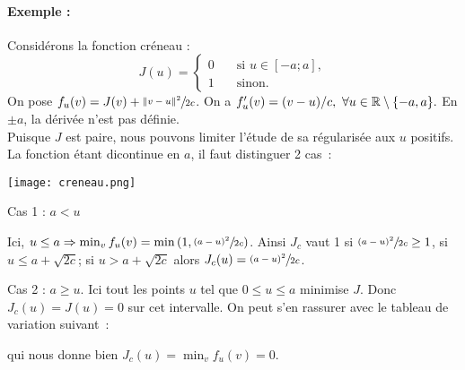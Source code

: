 \documentclass[main.tex]{subfiles}
\begin{document}
\begin{multicols}{2}
\paragraph{Exemple :} Considérons la fonction créneau :
$$J(u)= \left\{  \begin{aligned}
0 \quad & \textrm{si } u \in [-a;a], \\ 1 \quad & \textrm{sinon}. 
\end{aligned}   \right. $$
On pose $f_u(v) = J(v) + \sfrac{\| v-u \|^2}{2c}$.
On a $f'_u(v) = (v-u)/c, \ \forall u \in \mathbb{R} \setminus \{ -a, a \}. $
En $\pm a$, la dérivée n'est pas définie. \\
Puisque $J$ est paire, nous pouvons limiter l'étude de sa régularisée aux $u$ positifs. La fonction étant dicontinue en $a$, il faut distinguer 2 cas~:
\begin{center}
\texttt{[image: creneau.png]}
\end{center}
\end{multicols}
\begin{myitemize}
\renewcommand{\labelitemi}{\scriptsize$\bullet$} 
\item Cas 1 : $a < u$
\begin{center}
\end{center}
Ici, $u\leq a \Rightarrow \min_v f_u(v) = \min \left(1, \sfrac{(a-u)^2}{2c} \right)  $. Ainsi $J_c$ vaut 1 si $\sfrac{(a-u)^2}{2c} \geq 1$, \ie si $u\leq a+\sqrt{2c}$; si $u>a+\sqrt{2c}$ alors $J_c(u)=\sfrac{(a-u)^2}{2c}$.
\item Cas 2 : $ a \geq u$. Ici tout les points $u$ tel que $0\leq u \leq a$ minimise $J$. Donc $J_c(u)=J(u)=0$ sur cet intervalle. On peut s'en rassurer avec le tableau de variation suivant~:
\begin{center}
\end{center}
qui nous donne bien $J_c(u) = \min_v f_u(v) = 0$.
\end{myitemize}
\end{document}
